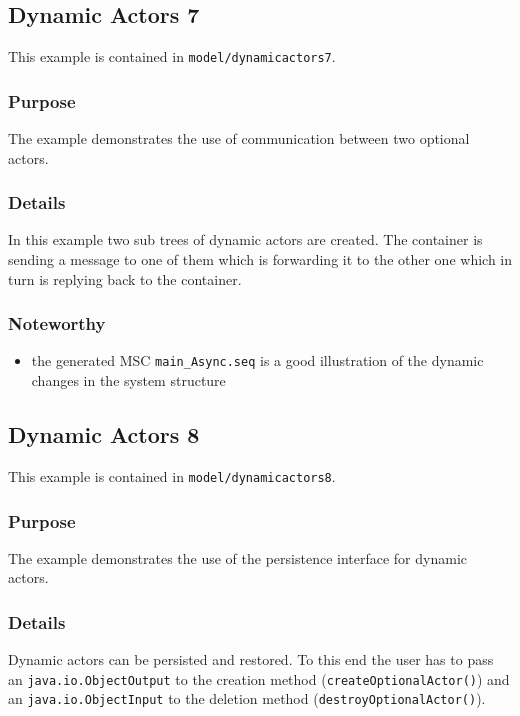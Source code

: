\subsection{Dynamic Actors 7}

This example is contained in \texttt{model/dynamicactors7}.

\subsubsection{Purpose}

The example demonstrates the use of communication between two optional actors.

\subsubsection{Details}

In this example two sub trees of dynamic actors are created. The container is sending a message to one of them which is forwarding
it to the other one which in turn is replying back to the container.

\subsubsection{Noteworthy}

\begin{itemize}
\item the generated MSC \texttt{main\_Async.seq} is a good illustration of the dynamic changes in the system structure
\end{itemize}

\subsection{Dynamic Actors 8}

This example is contained in \texttt{model/dynamicactors8}.

\subsubsection{Purpose}

The example demonstrates the use of the persistence interface for dynamic actors.

\subsubsection{Details}

Dynamic actors can be persisted and restored. To this end the user has to pass an \texttt{java.io.ObjectOutput} to
the creation method (\texttt{createOptionalActor()}) and an \texttt{java.io.ObjectInput} to the deletion method (\texttt{destroyOptionalActor()}).

